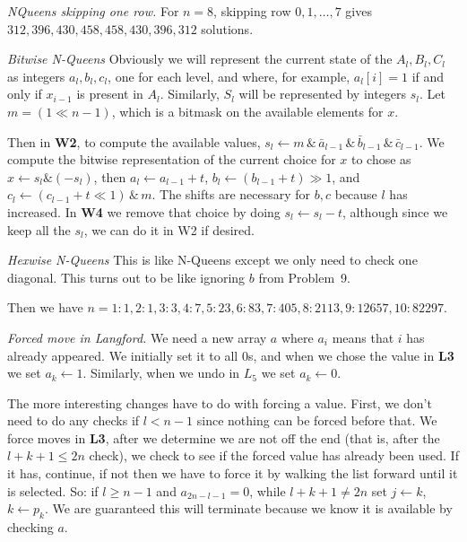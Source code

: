  {\it NQueens skipping one row.}\hfil\break
For $n=8$, skipping row $0, 1, \ldots, 7$ gives ${312, 396,
430, 458, 458, 430, 396, 312}$ solutions.

 {\it Bitwise N-Queens}\hfil\break
Obviously we will represent the current state of the $A_l, B_l, C_l$ 
as integers $a_l, b_l, c_l$, one for each level, and where, for example, 
$a_l\left[i\right] = 1$ if and only if $x_{i-1}$ is present in $A_l$.  
Similarly, $S_l$ will be represented by integers $s_l$.  Let 
$m = \left(1 \ll {n-1}\right)$, which is a bitmask on the available elements
for $x$.

Then in {\bf W2}, to compute the available values,
$s_l \leftarrow m \,\&\, {\bar a_{l-1}} \,\&\, {\bar b_{l-1}} \,\&\, 
{\bar c_{l-1}}$. We compute the bitwise representation of the current choice 
for $x$ to chose as $x \leftarrow s_l \& \left(- s_l\right)$, then 
$a_l \leftarrow a_{l-1} + t$, $b_l \leftarrow \left(b_{l-1} + t\right) \gg 1$, 
and  $c_l \leftarrow \left( {c_{l-1} + t} \ll 1 \right) \,\&\, m$.  The shifts 
are necessary for $b, c$ because $l$ has increased.  In {\bf W4} we
remove that choice by doing $s_l \leftarrow s_l - t$, although since we keep
all the $s_l$, we can do it in W2 if desired.

 {\it Hexwise N-Queens}\hfil\break
This is like N-Queens except we only need to check one diagonal.  This turns out
to be like ignoring $b$ from Problem~9.

Then we have $n=1: 1, 2: 1, 3: 3, 4: 7, 5: 23, 6: 83, 7: 405, 8: 2113, 9: 12657,
10: 82297$.

 {\it Forced move in Langford.}\hfil\break
We need a new array $a$ where $a_i$ means that $i$ has already appeared.
We initially set it to all 0s, and when we chose the value in {\bf L3}
we set $a_k \leftarrow 1$.  Similarly, when we undo in $L_5$ we set
$a_k \leftarrow 0$.

The more interesting changes have to do with forcing a value.  First,
we don't need to do any checks if $l < n - 1$ since nothing can be forced
before that.  We force moves in {\bf L3}, after we determine we are not
off the end (that is, after the $l + k + 1 \le 2 n$ check), we check to see 
if the forced value has already been used.  If it has, continue, if not
then we have to force it by walking the list forward until it is selected.
So: if $l \ge n - 1$ and $a_{2n - l - 1} = 0$, while $l + k + 1 \ne 2 n$
set $j \leftarrow k$, $k \leftarrow p_k$.  We are guaranteed this will
terminate because we know it is available by checking $a$.

